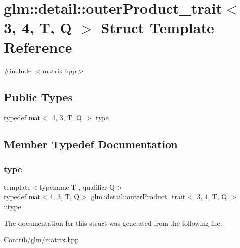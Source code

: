 \hypertarget{structglm_1_1detail_1_1outer_product__trait_3_013_00_014_00_01_t_00_01_q_01_4}{}\section{glm\+:\+:detail\+:\+:outer\+Product\+\_\+trait$<$ 3, 4, T, Q $>$ Struct Template Reference}
\label{structglm_1_1detail_1_1outer_product__trait_3_013_00_014_00_01_t_00_01_q_01_4}


{\ttfamily \#include $<$matrix.\+hpp$>$}

\subsection*{Public Types}
\begin{DoxyCompactItemize}
\item 
typedef \mbox{\hyperlink{structglm_1_1mat}{mat}}$<$ 4, 3, T, Q $>$ \mbox{\hyperlink{structglm_1_1detail_1_1outer_product__trait_3_013_00_014_00_01_t_00_01_q_01_4_a49854a641e22e4e4e6dce870f1baec2c}{type}}
\end{DoxyCompactItemize}


\subsection{Member Typedef Documentation}
\mbox{\label{structglm_1_1detail_1_1outer_product__trait_3_013_00_014_00_01_t_00_01_q_01_4_a49854a641e22e4e4e6dce870f1baec2c}} 
\subsubsection{\texorpdfstring{type}{type}}
{\footnotesize\ttfamily template$<$typename T , qualifier Q$>$ \\
typedef \mbox{\hyperlink{structglm_1_1mat}{mat}}$<$4, 3, T, Q$>$ \mbox{\hyperlink{structglm_1_1detail_1_1outer_product__trait}{glm\+::detail\+::outer\+Product\+\_\+trait}}$<$ 3, 4, T, Q $>$\+::\mbox{\hyperlink{structglm_1_1detail_1_1outer_product__trait_3_013_00_014_00_01_t_00_01_q_01_4_a49854a641e22e4e4e6dce870f1baec2c}{type}}}



The documentation for this struct was generated from the following file\+:\begin{DoxyCompactItemize}
\item 
Contrib/glm/\mbox{\hyperlink{matrix_8hpp}{matrix.\+hpp}}\end{DoxyCompactItemize}
